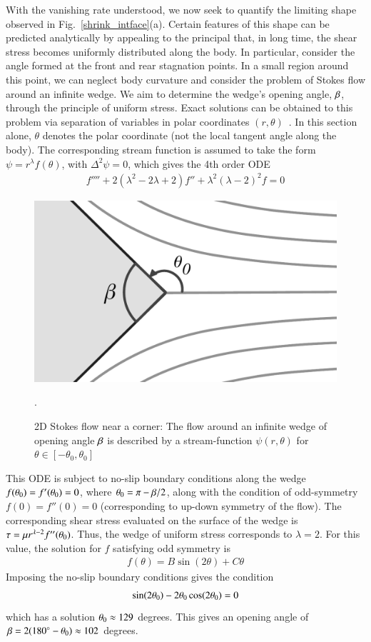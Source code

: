 \documentclass[preprint, 10pt]{elsarticle}
\begin{document}
With the vanishing rate understood, we now seek to quantify the limiting shape observed in Fig.~\ref{shrink_intface}(a). Certain features of this shape can be predicted analytically by appealing to the principal that, in long time, the shear stress becomes uniformly distributed along the body. In particular, consider the angle formed at the front and rear stagnation points. In a small region around this point, we can neglect body curvature and consider the problem of Stokes flow around an infinite wedge. We aim to determine the wedge's opening angle, $\beta$, through the principle of uniform stress. Exact solutions can be obtained to this problem via separation of variables in polar coordinates $(r, \theta)$~\cite{poz1997}. In this section alone, $\theta$ denotes the polar coordinate (not the local tangent angle along the body). The corresponding stream function is assumed to take the form $\psi = r^{\lambda}f(\theta)$, with $\Delta^2 \psi = 0$, which gives the 4th order ODE~\cite{poz1997}
\begin{align*}
  f'''' + 2(\lambda^2 - 2 \lambda + 2)f'' + \lambda^2(\lambda-2)^2 f = 0
\end{align*}

\begin{figure}%
\begin{center}
\includegraphics[width = 0.4 \textwidth]{./figs/corner.pdf}
\caption{2D Stokes flow near a corner: The flow around an infinite wedge of opening angle $\beta$ is described by a stream-function $\psi(r,\theta)$ for $\theta \in [-\theta_0, \theta_0]$}.
\label{corner}
\end{center}
\end{figure}
 
This ODE is subject to no-slip boundary conditions along the wedge $f(\theta_0) = f'(\theta_0) = 0$, where $\theta_0 = \pi - \beta/2$, along with the condition of odd-symmetry $f(0) = f''(0) = 0$ (corresponding to up-down symmetry of the flow).  The corresponding shear stress evaluated on the surface of the wedge is $\tau = \mu r^{\lambda-2} f''(\theta_0)$. Thus, the wedge of uniform stress corresponds to $\lambda = 2$. For this value, the solution for $f$ satisfying odd symmetry is
\begin{align*}
  f(\theta) = B \sin (2 \theta) + C \theta
\end{align*}
Imposing the no-slip boundary conditions gives the condition
\begin{align*}
  \sin(2 \theta_0) - 2 \theta_0 \cos(2 \theta_0) = 0
\end{align*}
which has a solution $\theta_0 \approx 129$ degrees. This gives an opening angle of $\beta = 2(180^{\circ} - \theta_0) \approx 102$ degrees. 
\end{document}
